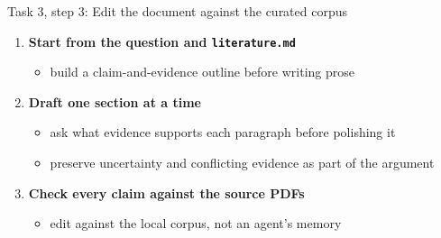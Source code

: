 \begin{frame}{Task 3, step 3: Edit the document against the curated corpus}
  \vfill
  \begin{enumerate}\setlength\itemsep{0.8em}
    \item \textbf{Start from the question and \texttt{literature.md}}
      \begin{itemize}\small
        \item build a claim-and-evidence outline before writing prose
      \end{itemize}
    \item \textbf{Draft one section at a time}
      \begin{itemize}\small
        \item ask what evidence supports each paragraph before polishing it
        \item preserve uncertainty and conflicting evidence as part of the argument
      \end{itemize}
    \item \textbf{Check every claim against the source PDFs}
      \begin{itemize}\small
        \item edit against the local corpus, not an agent's memory
      \end{itemize}
  \end{enumerate}
  \vspace{1.0cm plus 1fill}
\end{frame}

